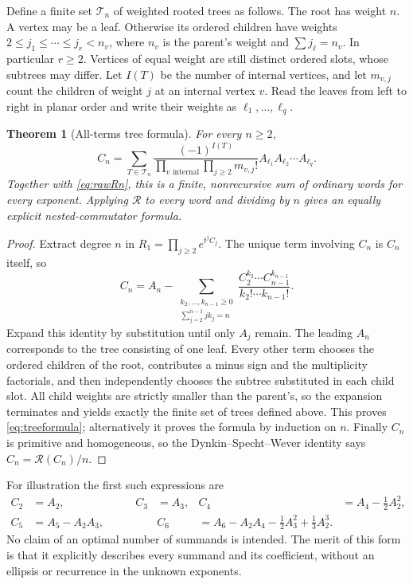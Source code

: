 \documentclass[11pt]{article}
\newtheorem{theorem}{Theorem}[section]
\theoremstyle{definition}
\theoremstyle{remark}
\newcommand{\Rbr}{\mathcal R}
\numberwithin{equation}{section}
\begin{document}
Define a finite set $\mathcal T_n$ of weighted rooted trees as follows. The root has weight $n$. A vertex may be a leaf. Otherwise its ordered children have weights
$2\leq j_1\leq\cdots\leq j_r<n_v$, where $n_v$ is the parent's weight and $\sum j_\ell=n_v$. In particular $r\geq2$. Vertices of equal weight are still distinct ordered slots, whose subtrees may differ. Let $I(T)$ be the number of internal vertices, and let $m_{v,j}$ count the children of weight $j$ at an internal vertex $v$. Read the leaves from left to right in planar order and write their weights as $\ell_1,\ldots,\ell_q$.
\begin{theorem}[All-terms tree formula]\label{thm:tree}
For every $n\geq2$,
\begin{equation}\label{eq:treeformula}
 C_n=\sum_{T\in\mathcal T_n}
 \frac{(-1)^{I(T)}}{\displaystyle\prod_{v\text{ internal}}\prod_{j\geq2}m_{v,j}!}
          A_{\ell_1}A_{\ell_2}\cdots A_{\ell_q}.
\end{equation}
Together with \eqref{eq:rawRn}, this is a finite, nonrecursive sum of ordinary words for every exponent. Applying $\Rbr$ to every word and dividing by $n$ gives an equally explicit nested-commutator formula.
\end{theorem}
\begin{proof}
Extract degree $n$ in $R_1=\prod_{j\geq2}e^{t^jC_j}$. The unique term involving $C_n$ is $C_n$ itself, so
\begin{equation}\label{eq:Cpartitions}
 C_n=A_n-
 \sum_{\substack{k_2,\ldots,k_{n-1}\geq0\\
                  \sum_{j=2}^{n-1}jk_j=n}}
       \frac{C_2^{k_2}\cdots C_{n-1}^{k_{n-1}}}
            {k_2!\cdots k_{n-1}!}.
\end{equation}
Expand this identity by substitution until only $A_j$ remain. The leading $A_n$ corresponds to the tree consisting of one leaf. Every other term chooses the ordered children of the root, contributes a minus sign and the multiplicity factorials, and then independently chooses the subtree substituted in each child slot. All child weights are strictly smaller than the parent's, so the expansion terminates and yields exactly the finite set of trees defined above. This proves \eqref{eq:treeformula}; alternatively it proves the formula by induction on $n$. Finally $C_n$ is primitive and homogeneous, so the Dynkin--Specht--Wever identity says $C_n=\Rbr(C_n)/n$.
\end{proof}
For illustration the first such expressions are
\begin{align*}
 C_2&=A_2,& C_3&=A_3,& C_4&=A_4-\tfrac12A_2^2,\\
 C_5&=A_5-A_2A_3,\qquad&&
 C_6&=A_6-A_2A_4-\tfrac12A_3^2+\tfrac13A_2^3.
\end{align*}
No claim of an optimal number of summands is intended. The merit of this form is that it explicitly describes every summand and its coefficient, without an ellipsis or recurrence in the unknown exponents.
\end{document}

